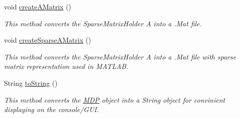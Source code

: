\begin{DoxyCompactItemize}
void \hyperlink{classmdp_1_1core_1_1_m_d_p_aab4fc6ad8c299f88d6619cfd059b3931}{create\+A\+Matrix} ()
\begin{DoxyCompactList}\small\item\em This method converts the Sparse\+Matrix\+Holder A into a .Mat file. \end{DoxyCompactList}\item 
void \hyperlink{classmdp_1_1core_1_1_m_d_p_ab378c6028d8b83259ee5f630736d183e}{create\+Sparse\+A\+Matrix} ()
\begin{DoxyCompactList}\small\item\em This method converts the Sparse\+Matrix\+Holder A into a .Mat file with sparse matrix representation used in M\+A\+T\+L\+A\+B. \end{DoxyCompactList}\item 
String \hyperlink{classmdp_1_1core_1_1_m_d_p_aeeeba49692fd6972b6833f511e07621b}{to\+String} ()
\begin{DoxyCompactList}\small\item\em This method converts the \hyperlink{classmdp_1_1core_1_1_m_d_p}{M\+D\+P} object into a String object for convinient displaying on the console/\+G\+U\+I. \end{DoxyCompactList}\end{DoxyCompactItemize}
